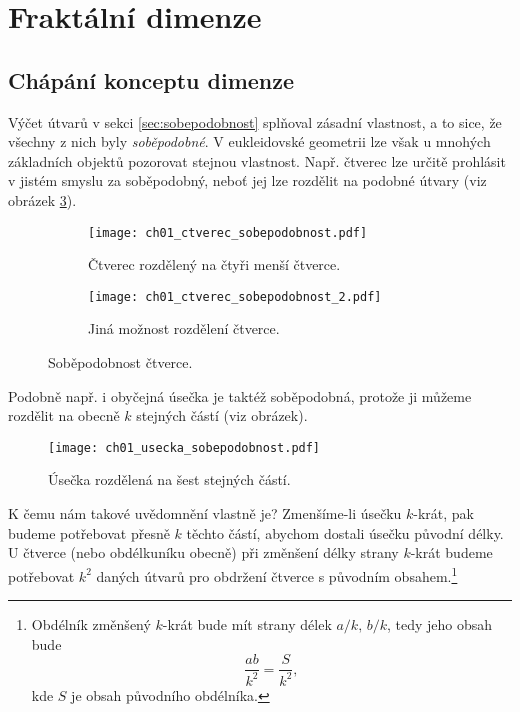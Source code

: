 \section{Fraktální dimenze}\label{sec:fraktalni_dimenze}

\subsection{Chápání konceptu dimenze}\label{subsec:koncept-dimenze}

Výčet útvarů v sekci \ref{sec:sobepodobnost} splňoval zásadní vlastnost, a to sice, že všechny z nich byly \emph{soběpodobné}. V eukleidovské geometrii lze však u mnohých základních objektů pozorovat stejnou vlastnost. Např. čtverec lze určitě prohlásit v jistém smyslu za soběpodobný, neboť jej lze rozdělit na podobné útvary (viz obrázek \ref{fig:sobepodobnost-ctverce}).
\begin{figure}[h]
    \centering
    \begin{subfigure}[b]{\subfigwidth}
        \centering
        \texttt{[image: ch01\_ctverec\_sobepodobnost.pdf]}
        \caption{Čtverec rozdělený na čtyři menší čtverce.}
        \label{subfig:sobepodobnost-ctverce-1}
    \end{subfigure}
    \begin{subfigure}[b]{\subfigwidth}
        \centering
        \texttt{[image: ch01\_ctverec\_sobepodobnost\_2.pdf]}
        \caption{Jiná možnost rozdělení čtverce.}
        \label{subfig:sobepodobnost-ctverce-2}
    \end{subfigure}
    \caption{Soběpodobnost čtverce.}
    \label{fig:sobepodobnost-ctverce}
\end{figure}
Podobně např. i obyčejná úsečka je taktéž soběpodobná, protože ji můžeme rozdělit na obecně $k$ stejných částí (viz obrázek).\par
\begin{figure}[h]
    \centering
    \texttt{[image: ch01\_usecka\_sobepodobnost.pdf]}
    \caption{Úsečka rozdělená na šest stejných částí.}
\end{figure}
K čemu nám takové uvědomnění vlastně je? Zmenšíme-li úsečku $k$-krát, pak budeme potřebovat přesně $k$ těchto částí, abychom dostali úsečku původní délky. U čtverce (nebo obdélkuníku obecně) při změnšení délky strany $k$-krát budeme potřebovat $k^2$ daných útvarů pro obdržení čtverce s původním obsahem.\footnote{Obdélník změnšený $k$-krát bude mít strany délek $a/k,\,b/k$, tedy jeho obsah bude
\[\dfrac{ab}{k^2}=\dfrac{S}{k^2},\]
kde $S$ je obsah původního obdélníka.}
